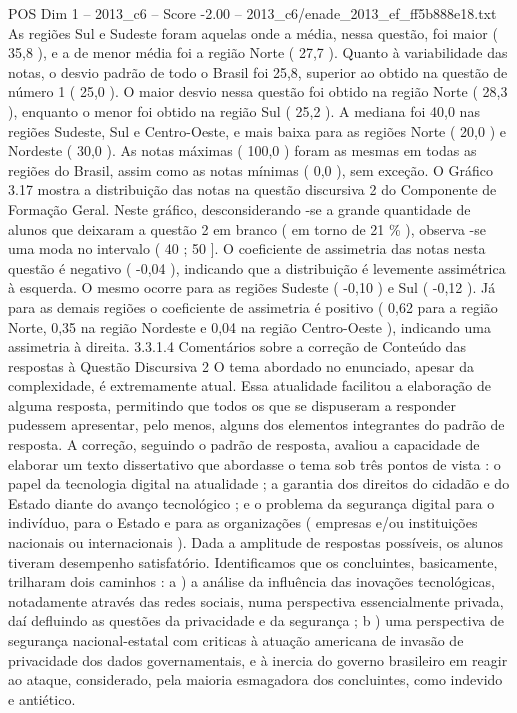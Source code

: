 \begin{textsample}{POS Dim 1 – 2013\_c6 – Score -2.00 – 2013\_c6/enade\_2013\_ef\_ff5b888e18.txt}
As regiões Sul e Sudeste foram aquelas onde a média, nessa questão, foi maior ( 35,8 ), e a de menor média foi a região Norte ( 27,7 ).
Quanto à variabilidade das notas, o desvio padrão de todo o Brasil foi 25,8, superior ao obtido na questão de número 1 ( 25,0 ).
O maior desvio nessa questão foi obtido na região Norte ( 28,3 ), enquanto o menor foi obtido na região Sul ( 25,2 ).
A mediana foi 40,0 nas regiões Sudeste, Sul e Centro-Oeste, e mais baixa para as regiões Norte ( 20,0 ) e Nordeste ( 30,0 ).
As notas máximas ( 100,0 ) foram as mesmas em todas as regiões do Brasil, assim como as notas mínimas ( 0,0 ), sem exceção.
O Gráfico 3.17 mostra a distribuição das notas na questão discursiva 2 do Componente de Formação Geral.
Neste gráfico, desconsiderando -se a grande quantidade de alunos que deixaram a questão 2 em branco ( em torno de 21 \% ), observa -se uma moda no intervalo ( 40 ; 50 ].
O coeficiente de assimetria das notas nesta questão é negativo ( -0,04 ), indicando que a distribuição é levemente assimétrica à esquerda.
O mesmo ocorre para as regiões Sudeste ( -0,10 ) e Sul ( -0,12 ).
Já para as demais regiões o coeficiente de assimetria é positivo ( 0,62 para a região Norte, 0,35 na região Nordeste e 0,04 na região Centro-Oeste ), indicando uma assimetria à direita. 3.3.1.4 Comentários sobre a correção de Conteúdo das respostas à Questão Discursiva 2 O tema abordado no enunciado, apesar da complexidade, é extremamente atual.
Essa atualidade facilitou a elaboração de alguma resposta, permitindo que todos os que se dispuseram a responder pudessem apresentar, pelo menos, alguns dos elementos integrantes do padrão de resposta.
A correção, seguindo o padrão de resposta, avaliou a capacidade de elaborar um texto dissertativo que abordasse o tema sob três pontos de vista : o papel da tecnologia digital na atualidade ; a garantia dos direitos do cidadão e do Estado diante do avanço tecnológico ; e o problema da segurança digital para o indivíduo, para o Estado e para as organizações ( empresas e/ou instituições nacionais ou internacionais ).
Dada a amplitude de respostas possíveis, os alunos tiveram desempenho satisfatório.
Identificamos que os concluintes, basicamente, trilharam dois caminhos : a ) a análise da influência das inovações tecnológicas, notadamente através das redes sociais, numa perspectiva essencialmente privada, daí defluindo as questões da privacidade e da segurança ; b ) uma perspectiva de segurança nacional-estatal com criticas à atuação americana de invasão de privacidade dos dados governamentais, e à inercia do governo brasileiro em reagir ao ataque, considerado, pela maioria esmagadora dos concluintes, como indevido e antiético.

\end{textsample}
